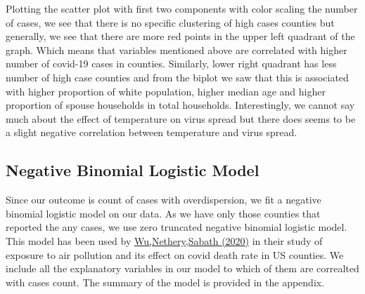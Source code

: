 \documentclass[
]{article}
\begin{document}
Plotting the scatter plot with first two components with color scaling
the number of cases, we see that there is no specific clustering of high
cases counties but generally, we see that there are more red points in
the upper left quadrant of the graph. Which means that variables
mentioned above are correlated with higher number of covid-19 cases in
counties. Similarly, lower right quadrant has less number of high case
counties and from the biplot we saw that this is associated with higher
proportion of white population, higher median age and higher proportion
of spouse households in total households. Interestingly, we cannot say
much about the effect of temperature on virus spread but there does
seems to be a slight negative correlation between temperature and virus
spread.

\hypertarget{negative-binomial-logistic-model}{%
\subsection{Negative Binomial Logistic
Model}\label{negative-binomial-logistic-model}}

Since our outcome is count of cases with overdispersion, we fit a
negative binomial logistic model on our data. As we have only those
counties that reported the any cases, we use zero truncated negative
binomial logistic model. This model has been used by
\href{https://www.medrxiv.org/node/78162.external-links.html}{Wu,Nethery,Sabath
(2020)} in their study of exposure to air pollution and its effect on
covid death rate in US counties. We include all the explanatory
variables in our model to which of them are correalted with cases count.
The summary of the model is provided in the appendix.
\end{document}
